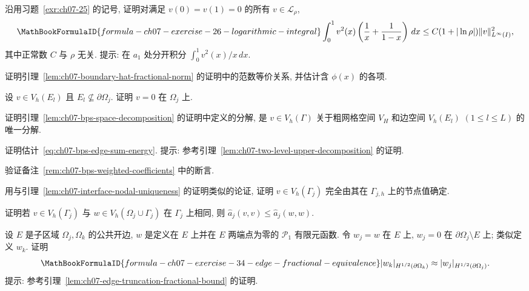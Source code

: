 \begin{MBExercise}
\label{exr:ch07-26}
沿用习题~\ref{exr:ch07-25} 的记号, 证明对满足 $v(0)=v(1)=0$ 的所有 $v\in\mathcal L_\rho$,
\[
\MathBookFormulaID{formula-ch07-exercise-26-logarithmic-integral}
\int_0^1v^2(x)\left(\frac1x+\frac1{1-x}\right)\,dx
\leq C(1+|\ln\rho|)\|v\|_{L^\infty(I)}^2,
\]
其中正常数 $C$ 与 $\rho$ 无关. 提示: 在 $a_1$ 处分开积分 $\int_0^1v^2(x)/x\,dx$.
\end{MBExercise}

\begin{MBExercise}
\label{exr:ch07-27}
证明引理~\ref{lem:ch07-boundary-hat-fractional-norm} 的证明中的范数等价关系, 并估计含 $\phi(x)$ 的各项.
\end{MBExercise}

\begin{MBExercise}
\label{exr:ch07-28}
设 $v\in V_h(E_l)$ 且 $E_l\nsubseteq\partial\Omega_j$. 证明 $v=0$ 在 $\Omega_j$ 上.
\end{MBExercise}

\begin{MBExercise}
\label{exr:ch07-29}
证明引理~\ref{lem:ch07-bps-space-decomposition} 的证明中定义的分解, 是 $v\in V_h(\Gamma)$ 关于粗网格空间 $V_H$ 和边空间 $V_h(E_l)$ $(1\leq l\leq L)$ 的唯一分解.
\end{MBExercise}

\begin{MBExercise}
\label{exr:ch07-30}
证明估计~\eqref{eq:ch07-bps-edge-sum-energy}. 提示: 参考引理~\ref{lem:ch07-two-level-upper-decomposition} 的证明.
\end{MBExercise}

\begin{MBExercise}
\label{exr:ch07-31}
验证备注~\ref{rem:ch07-bps-weighted-coefficients} 中的断言.
\end{MBExercise}

\begin{MBExercise}
\label{exr:ch07-32}
用与引理~\ref{lem:ch07-interface-nodal-uniqueness} 的证明类似的论证, 证明 $v\in V_h(\Gamma_j)$ 完全由其在 $\Gamma_{j,h}$ 上的节点值确定.
\end{MBExercise}

\begin{MBExercise}
\label{exr:ch07-33}
证明若 $v\in V_h(\Gamma_j)$ 与 $w\in V_h(\Omega_j\cup\Gamma_j)$ 在 $\Gamma_j$ 上相同, 则 $\widehat a_j(v,v)\leq\widehat a_j(w,w)$.
\end{MBExercise}

\begin{MBExercise}
\label{exr:ch07-34}
设 $E$ 是子区域 $\Omega_j,\Omega_k$ 的公共开边, $w$ 是定义在 $E$ 上并在 $E$ 两端点为零的 $\mathcal P_1$ 有限元函数. 令 $w_j=w$ 在 $E$ 上, $w_j=0$ 在 $\partial\Omega_j\setminus E$ 上; 类似定义 $w_k$. 证明
\[
\MathBookFormulaID{formula-ch07-exercise-34-edge-fractional-equivalence}
|w_k|_{H^{1/2}(\partial\Omega_k)}
\approx|w_j|_{H^{1/2}(\partial\Omega_j)}.
\]
提示: 参考引理~\ref{lem:ch07-edge-truncation-fractional-bound} 的证明.
\end{MBExercise}

